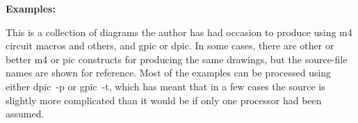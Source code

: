 \documentclass[11pt]{article}
\begin{document}
  \hfill
  {\large\bf Examples:
    }
  \hfill\break

  This is a collection of diagrams the author has had occasion to
  produce using m4 circuit macros and others, and gpic or dpic.  In
  some cases, there are other or better m4 or pic constructs for
  producing the same drawings, but the source-file names are shown for
  reference.  Most of the examples can be processed using either
  dpic~-p or gpic~-t, which has meant that in a few cases the source is
  slightly more complicated than it would be if only one processor had
  been assumed.


% 


\end{document}
